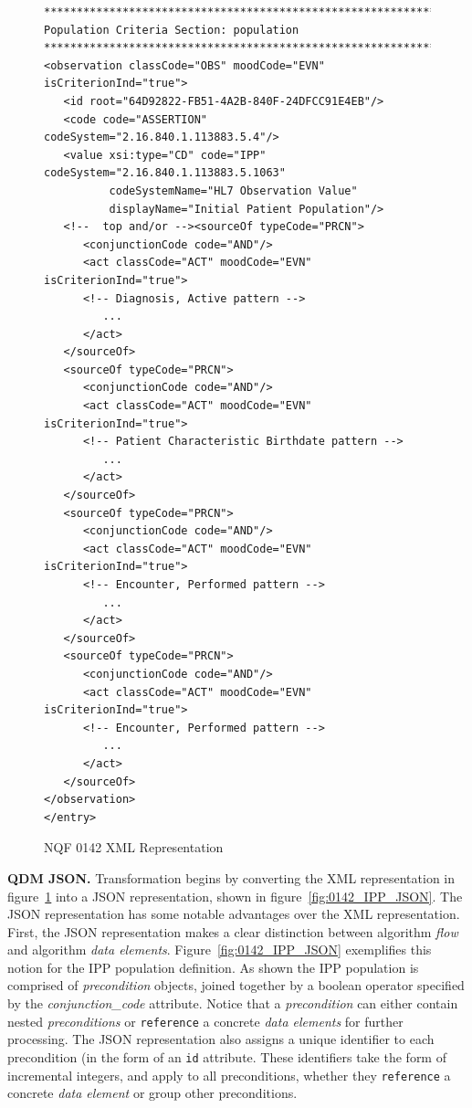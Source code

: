 \documentclass{amia}
\begin{document}
\begin{figure}[H]
\begin{verbatim}
**************************************************************   
Population Criteria Section: population 
**************************************************************
<observation classCode="OBS" moodCode="EVN" isCriterionInd="true">
   <id root="64D92822-FB51-4A2B-840F-24DFCC91E4EB"/>
   <code code="ASSERTION" codeSystem="2.16.840.1.113883.5.4"/>
   <value xsi:type="CD" code="IPP" codeSystem="2.16.840.1.113883.5.1063"
          codeSystemName="HL7 Observation Value"
          displayName="Initial Patient Population"/>
   <!--  top and/or --><sourceOf typeCode="PRCN">
      <conjunctionCode code="AND"/>
      <act classCode="ACT" moodCode="EVN" isCriterionInd="true">
      <!-- Diagnosis, Active pattern -->
         ...
      </act>
   </sourceOf>
   <sourceOf typeCode="PRCN">
      <conjunctionCode code="AND"/>
      <act classCode="ACT" moodCode="EVN" isCriterionInd="true">
      <!-- Patient Characteristic Birthdate pattern -->
         ...
      </act>
   </sourceOf>
   <sourceOf typeCode="PRCN">
      <conjunctionCode code="AND"/>
      <act classCode="ACT" moodCode="EVN" isCriterionInd="true">
      <!-- Encounter, Performed pattern -->
         ...
      </act>
   </sourceOf>
   <sourceOf typeCode="PRCN">
      <conjunctionCode code="AND"/>
      <act classCode="ACT" moodCode="EVN" isCriterionInd="true">
      <!-- Encounter, Performed pattern -->
         ...
      </act>
   </sourceOf>
</observation>
</entry>
\end{verbatim}    
\caption{NQF 0142 XML Representation} 
\label{fig:0142_IPP_XML}
\end{figure}

\textbf{QDM JSON.}
Transformation begins by converting the XML representation in figure~\ref{fig:0142_IPP_XML} into a JSON representation, shown in figure~\ref{fig:0142_IPP_JSON}. The JSON representation has some notable advantages over the XML representation. First, the JSON representation makes a clear distinction between algorithm \textit{flow} and algorithm \textit{data elements}. Figure~\ref{fig:0142_IPP_JSON} exemplifies this notion for the IPP population definition. As shown the IPP population is comprised of \textit{precondition} objects, joined together by a boolean operator specified by the \textit{conjunction\_code} attribute. Notice that a \textit{precondition} can either contain nested \textit{preconditions} or \texttt{reference} a concrete \textit{data elements} for further processing. The JSON representation also assigns a unique identifier to each precondition (in the form of an \texttt{id} attribute. These identifiers take the form of incremental integers, and apply to all preconditions, whether they \texttt{reference} a concrete \textit{data element} or group other preconditions.
\end{document}
